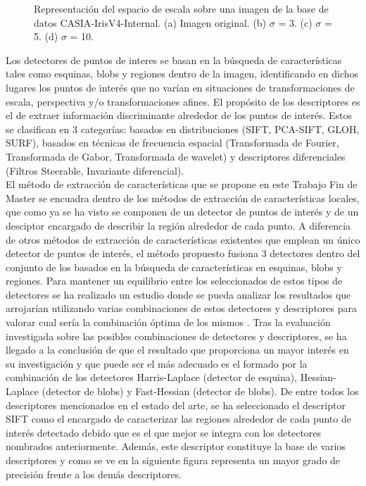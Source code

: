 \begin{figure}[htbp]
\centering
{}
\caption{Representación del espacio de escala sobre una imagen de la base de datos CASIA-IrisV4-Internal. (a) Imagen original. (b) $\sigma$ = 3. (c) $\sigma$ = 5. (d) $\sigma$ = 10.} \label{fig:señales}
\end{figure}

Los detectores de puntos de interes se basan en la búsqueda de características tales como esquinas, blobs y regiones dentro de la imagen, identificando en dichos lugares los puntos de interés que no varían en situaciones de transformaciones de escala, perspectiva y/o transformaciones afines. El propósito de los descriptores es el de extraer información discriminante alrededor de los puntos de interés. Estos se clasifican en 3 categorías: basados en distribuciones (SIFT, PCA-SIFT, GLOH, SURF), basados en técnicas de frecuencia espacial (Transformada de Fourier, Transformada de Gabor, Transformada de wavelet) y descriptores diferenciales (Filtros Steerable, Invariante diferencial). \\

El método de extracción de características que se propone en este Trabajo Fin de Master se encuadra dentro de los métodos de extracción de características locales, que como ya se ha visto se componen de un detector de puntos de interés y de un desciptor encargado de describir la región alrededor de cada punto. A diferencia de otros métodos de extracción de características existentes que emplean un único detector de puntos de interés, el método propuesto fusiona 3 detectores dentro del conjunto de los basados en la búsqueda de características en esquinas, blobs y regiones. Para mantener un equilibrio entre los seleccionados de estos tipos de detectores se ha realizado un estudio donde se pueda analizar los resultados que arrojarían utilizando varias combinaciones de estos detectores y descriptores para valorar cual sería la combinación óptima de los mismos \cite{Reference23} \cite{Reference24} \cite{Reference25}. Tras la evaluación investigada sobre las posibles combinaciones de detectores y descriptores, se ha llegado a la conclusión de que el resultado que proporciona un mayor interés en su investigación y que puede ser el más adecuado es el formado por la combinación de los detectores Harris-Laplace (detector de esquina), Hessian-Laplace (detector de blobs) y Fast-Hessian (detector de blobs). De entre todos los descriptores mencionados en el estado del arte, se ha seleccionado el descriptor SIFT como el encargado de caracterizar las regiones alrededor de cada punto de interés detectado debido que es el que mejor se integra con los detectores nombrados anteriormente. Además, este descriptor constituye la base de varios descriptores y como se ve en la siguiente figura representa un mayor grado de precisión frente a los demás descriptores. \\


